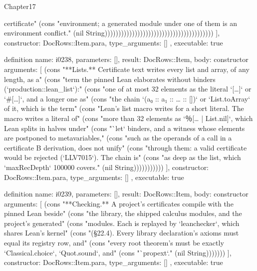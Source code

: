\begin{lexlean}{Chapter17}
\begin{semanticmodule}
{{certificate" (cons "environment; a generated module under one of them is an environment conflict." (nil String))))))))))))))))))))))))))))))))))))))))
    ],
    constructor: DocRows::Item.para,
    type_arguments: []
  },
  executable: true
}

definition{
  name: i0238,
  parameters: [],
  result: DocRows::Item,
  body: constructor{
    arguments: [
      (cons "**Lists.** Certificate text writes every list and array, of any length, as a" (cons "term the pinned Lean elaborates without binders (`production::lean_list`):" (cons "one of at most 32 elements as the literal `[…]` or `#[…]`, and a longer one as" (cons "the chain `(a₀ :: a₁ :: … :: [])` or `List.toArray` of it, which is the term" (cons "Lean's list macro writes for a short literal. The macro writes a literal of" (cons "more than 32 elements as `％[… | List.nil]`, which Lean splits in halves under" (cons "`let` binders, and a witness whose elements are postponed to metavariables," (cons "such as the operands of a call in a certificate B derivation, does not unify" (cons "through them: a valid certificate would be rejected (`LLV7015`). The chain is" (cons "as deep as the list, which `maxRecDepth` 100000 covers." (nil String)))))))))))
    ],
    constructor: DocRows::Item.para,
    type_arguments: []
  },
  executable: true
}

definition{
  name: i0239,
  parameters: [],
  result: DocRows::Item,
  body: constructor{
    arguments: [
      (cons "**Checking.** A project's certificates compile with the pinned Lean beside" (cons "the library, the shipped calculus modules, and the project's generated" (cons "modules. Each is replayed by `leanchecker`, which shares Lean's kernel" (cons "(§22.4). Every library declaration's axioms must equal its registry row, and" (cons "every root theorem's must be exactly `Classical.choice`, `Quot.sound`, and" (cons "`propext`." (nil String)))))))
    ],
    constructor: DocRows::Item.para,
    type_arguments: []
  },
  executable: true
}


\end{semanticmodule}
\end{lexlean}
